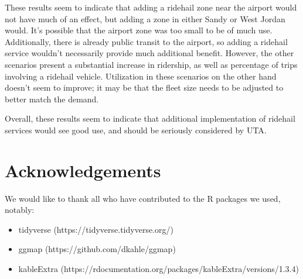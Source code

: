 \documentclass[3p, authoryear]{elsarticle} %
\providecommand{\tightlist}{%
  \setlength{\itemsep}{0pt}\setlength{\parskip}{0pt}}
\begin{document}
These results seem to indicate that adding a ridehail zone near the airport would not have much of an effect, but adding a zone in either Sandy or West Jordan would. It's possible that the airport zone was too small to be of much use. Additionally, there is already public transit to the airport, so adding a ridehail service wouldn't necessarily provide much additional benefit. However, the other scenarios present a substantial increase in ridership, as well as percentage of trips involving a ridehail vehicle. Utilization in these scenarios on the other hand doesn't seem to improve; it may be that the fleet size needs to be adjusted to better match the demand.

Overall, these results seem to indicate that additional implementation of ridehail services would see good use, and should be seriously considered by UTA.

\hypertarget{acknowledgements}{%
\section*{Acknowledgements}\label{acknowledgements}}

We would like to thank all who have contributed to the R packages we used, notably:

\begin{itemize}
\tightlist
\item
  tidyverse (https://tidyverse.tidyverse.org/)
\item
  ggmap (https://github.com/dkahle/ggmap)
\item
  kableExtra (https://rdocumentation.org/packages/kableExtra/versions/1.3.4)
\end{itemize}


\end{document}
